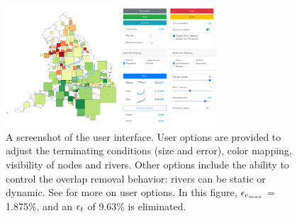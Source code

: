 {
\begin{figure}[tb!]
    \centering
    \includegraphics[width=0.7\textwidth,keepaspectratio]{figure/UI.png}
    \caption{A screenshot of the user interface. User options are provided to adjust the terminating conditions (size and error), color mapping, visibility of nodes and rivers. Other options include the ability to control the overlap removal behavior: rivers can be static or dynamic. See  for more on user options. In this figure, $ \epsilon_{c_{max}} $ = 1.875\%, and an $ \epsilon_{t} $ of 9.63\% is eliminated.}
    \label{fig:overview}
\end{figure}
}